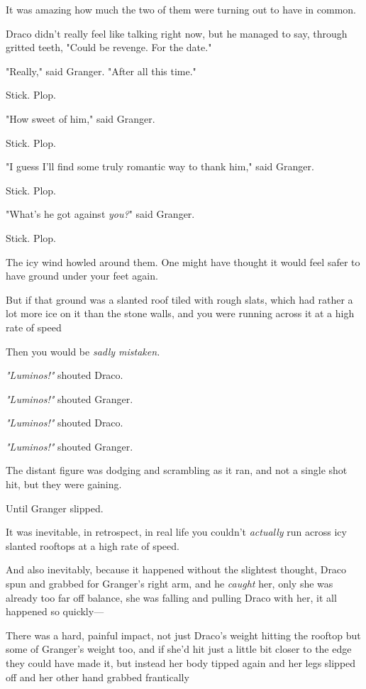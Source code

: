 It was amazing how much the two of them were turning out to have in common.

Draco didn't really feel like talking right now, but he managed to say, through
gritted teeth, "Could be revenge. For the date."

"Really," said Granger. "After all this time."

Stick. Plop.

"How sweet of him," said Granger.

Stick. Plop.

"I guess I'll find some truly romantic way to thank him," said Granger.

Stick. Plop.

"What's he got against \emph{you?}" said Granger.

Stick. Plop.

The icy wind howled around them.
\sbreak
One might have thought it would feel safer to have ground under your feet again.

But if that ground was a slanted roof tiled with rough slats, which had rather
a lot more ice on it than the stone walls, and you were running across it at a
high rate of speed{\el}

Then you would be \emph{sadly mistaken.}

\emph{"Luminos!"} shouted Draco.

\emph{"Luminos!"} shouted Granger.

\emph{"Luminos!"} shouted Draco.

\emph{"Luminos!"} shouted Granger.

The distant figure was dodging and scrambling as it ran, and not a single shot
hit, but they were gaining.

Until Granger slipped.

It was inevitable, in retrospect, in real life you couldn't \emph{actually} run
across icy slanted rooftops at a high rate of speed.

And also inevitably, because it happened without the slightest thought, Draco
spun and grabbed for Granger's right arm, and he \emph{caught} her, only she
was already too far off balance, she was falling and pulling Draco with her, it
all happened so quickly\mbox{---}

There was a hard, painful impact, not just Draco's weight hitting the rooftop
but some of Granger's weight too, and if she'd hit just a little bit closer to
the edge they could have made it, but instead her body tipped again and her
legs slipped off and her other hand grabbed frantically{\el}

